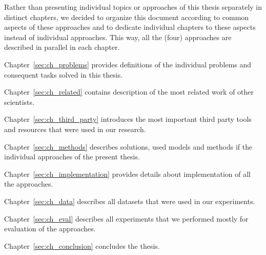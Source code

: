 Rather than presenting individual topics or approaches of this thesis separately in distinct chapters, we decided to organize this document according to common aspects of these approaches and to dedicate individual chapters to these aspects instead of individual approaches. This way, all the (four) approaches are described in parallel in each chapter. 

Chapter~\ref{sec:ch_problems} provides definitions of the individual problems and consequent tasks solved in this thesis.

Chapter~\ref{sec:ch_related} contains description of the most related work of other scientists.

Chapter~\ref{sec:ch_third_party} introduces the most important third party tools and resources that were used in our research.

Chapter~\ref{sec:ch_methods} describes solutions, used models and methods if the individual approaches of the present thesis.

Chapter~\ref{sec:ch_implementation} provides details about implementation of all the approaches.

Chapter~\ref{sec:ch_data} describes all datasets that were used in our experiments.

Chapter~\ref{sec:ch_eval} describes all experiments that we performed mostly for evaluation of the approaches.

Chapter~\ref{sec:ch_conclusion} concludes the thesis.

